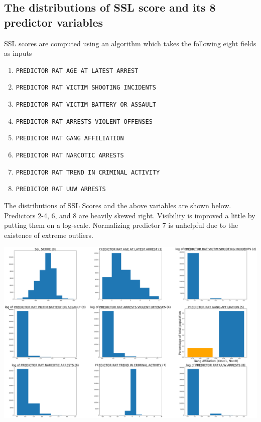 \subsection{The distributions of SSL score and its 8 predictor variables}
SSL scores are computed using an algorithm which takes the following eight fields as inputs\\
\begin{enumerate}[nolistsep]
    \item \texttt{PREDICTOR RAT AGE AT LATEST ARREST}
    \item \texttt{PREDICTOR RAT VICTIM SHOOTING INCIDENTS}
    \item \texttt{PREDICTOR RAT VICTIM BATTERY OR ASSAULT}
    \item \texttt{PREDICTOR RAT ARRESTS VIOLENT OFFENSES}
    \item \texttt{PREDICTOR RAT GANG AFFILIATION}
    \item \texttt{PREDICTOR RAT NARCOTIC ARRESTS}
    \item \texttt{PREDICTOR RAT TREND IN CRIMINAL ACTIVITY}
    \item \texttt{PREDICTOR RAT UUW ARRESTS}\\
\end{enumerate}

The distributions of SSL Scores and the above variables are shown below. Predictors 2-4, 6, and 8 are heavily skewed right. Visibility is improved a little by putting them on a log-scale. Normalizing predictor 7 is unhelpful due to the existence of extreme outliers.

\begin{center}
\includegraphics[scale=.2]{images/distribs.png}
\end{center}

